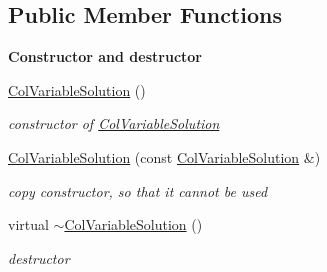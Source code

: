 \subsection*{Public Member Functions}
\begin{Indent}\textbf{ Constructor and destructor}\par
\begin{DoxyCompactItemize}
\item 
\mbox{\hyperlink{class_s_m_spp__di__unipi__it_1_1_col_variable_solution_a688ff4c13d6190fc4e6b9de1c0e8e94a}{Col\+Variable\+Solution}} ()
\begin{DoxyCompactList}\small\item\em constructor of \mbox{\hyperlink{class_s_m_spp__di__unipi__it_1_1_col_variable_solution}{Col\+Variable\+Solution}} \end{DoxyCompactList}\item 
\mbox{\hyperlink{class_s_m_spp__di__unipi__it_1_1_col_variable_solution_a3394024679af2d8c403f290b98add1da}{Col\+Variable\+Solution}} (const \mbox{\hyperlink{class_s_m_spp__di__unipi__it_1_1_col_variable_solution}{Col\+Variable\+Solution}} \&)
\begin{DoxyCompactList}\small\item\em copy constructor, so that it cannot be used \end{DoxyCompactList}\item 
\mbox{\label{class_s_m_spp__di__unipi__it_1_1_col_variable_solution_a4c25c43e0f721c9f77d86e3482f88eda}} 
virtual \mbox{\hyperlink{class_s_m_spp__di__unipi__it_1_1_col_variable_solution_a4c25c43e0f721c9f77d86e3482f88eda}{$\sim$\+Col\+Variable\+Solution}} ()
\begin{DoxyCompactList}\small\item\em destructor \end{DoxyCompactList}\end{DoxyCompactItemize}
\end{Indent}
